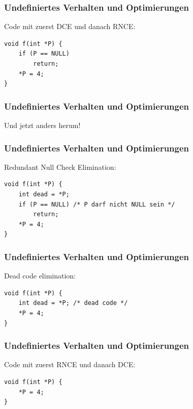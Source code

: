 \documentclass[12pt,compress]{beamer}
\begin{document}
\begin{frame}[fragile]
\frametitle{Undefiniertes Verhalten und Optimierungen}

Code mit zuerst DCE und danach RNCE:

\vfill

\begin{lstlisting}
void f(int *P) {
    if (P == NULL)
        return;
    *P = 4;
}
\end{lstlisting}
\end{frame}


\begin{frame}[fragile]
\frametitle{Undefiniertes Verhalten und Optimierungen}

\begin{center}
Und jetzt anders herum!
\end{center}

\end{frame}


\begin{frame}[fragile]
\frametitle{Undefiniertes Verhalten und Optimierungen}

Redundant Null Check Elimination:

\vfill

\begin{lstlisting}
void f(int *P) {
    int dead = *P;
    if (P == NULL) /* P darf nicht NULL sein */
        return;
    *P = 4;
}
\end{lstlisting}
\end{frame}


\begin{frame}[fragile]
\frametitle{Undefiniertes Verhalten und Optimierungen}

Dead code elimination:

\vfill

\begin{lstlisting}
void f(int *P) {
    int dead = *P; /* dead code */
    *P = 4;
}
\end{lstlisting}
\end{frame}


\begin{frame}[fragile]
\frametitle{Undefiniertes Verhalten und Optimierungen}

Code mit zuerst RNCE und danach DCE:

\vfill

\begin{lstlisting}
void f(int *P) {
    *P = 4;
}
\end{lstlisting}
\end{frame}
\end{document}
